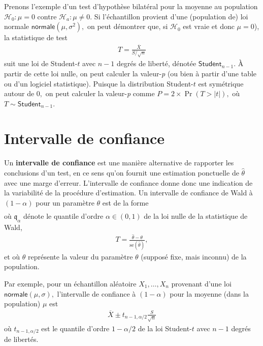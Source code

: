 \documentclass[
  11pt,
  letterpaper,
]{scrbook}
\theoremstyle{plain}
\theoremstyle{plain}
\theoremstyle{definition}
\theoremstyle{definition}
\theoremstyle{remark}
\begin{document}
Prenons l'exemple d'un test d'hypothèse bilatéral pour la moyenne au
population \(\mathscr{H}_0:\mu=0\) contre \(\mathscr{H}_a:\mu \neq 0.\)
Si l'échantillon provient d'une (population de) loi normale
\(\mathsf{normale}(\mu, \sigma^2),\) on peut démontrer que, si
\(\mathscr{H}_0\) est vraie et donc \(\mu=0\)), la statistique de test
\begin{align*}
T = \frac{\overline{X}}{S/\sqrt{n}}
\end{align*} suit une loi de Student-\(t\) avec \(n-1\) degrés de
liberté, dénotée \(\mathsf{Student}_{n-1}.\) À partir de cette loi
nulle, on peut calculer la valeur-\emph{p} (ou bien à partir d'une table
ou d'un logiciel statistique). Puisque la distribution Student-\(t\) est
symétrique autour de \(0,\) on peut calculer la valeur-\emph{p} comme
\(P = 2\times\Pr(T > |t|),\) où \(T \sim \mathsf{Student}_{n-1}.\)

\section{Intervalle de confiance}\label{intervalle-de-confiance}

Un \textbf{intervalle de confiance} est une manière alternative de
rapporter les conclusions d'un test, en ce sens qu'on fournit une
estimation ponctuelle de \(\hat{\theta}\) avec une marge d'erreur.
L'intervalle de confiance donne donc une indication de la variabilité de
la procédure d'estimation. Un intervalle de confiance de Wald à
\((1-\alpha)\) pour un paramètre \(\theta\) est de la forme
\begin{align*}
[\widehat{\theta} + \mathfrak{q}_{\alpha/2}\mathrm{se}(\widehat{\theta}), \widehat{\theta} +\mathfrak{q}_{1-\alpha/2}\times \mathrm{se}(\widehat{\theta})]
\end{align*} où \(\mathfrak{q}_{\alpha}\) dénote le quantile d'ordre
\(\alpha \in (0,1)\) de la loi nulle de la statistique de Wald,
\begin{align*}
T =\frac{\widehat{\theta}-\theta}{\mathrm{se}(\widehat{\theta})},
\end{align*} et où \(\theta\) représente la valeur du paramètre
\(\theta\) (supposé fixe, mais inconnu) de la population.

Par exemple, pour un échantillon aléatoire \(X_1, \ldots, X_n\)
provenant d'une loi \(\mathsf{normale}(\mu, \sigma),\) l'intervalle de
confiance à \((1-\alpha)\) pour la moyenne (dans la population) \(\mu\)
est \begin{align*}
\overline{X} \pm t_{n-1, \alpha/2} \frac{S}{\sqrt{n}}
\end{align*} où \(t_{n-1, \alpha/2}\) est le quantile d'ordre
\(1-\alpha/2\) de la loi Student-\(t\) avec \(n-1\) degrés de libertés.
\end{document}
